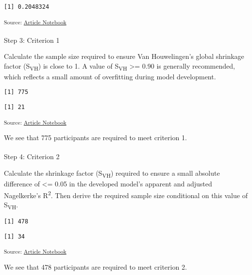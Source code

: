 \documentclass[
  letterpaper,
  DIV=11,
  numbers=noendperiod]{scrartcl}
\makeatletter
\let\oldparagraph\paragraph
\renewcommand{\paragraph}{
    \@ifstar
      \xxxParagraphStar
      \xxxParagraphNoStar
  }
\newcommand{\xxxParagraphStar}[1]{\oldparagraph*{#1}\mbox{}}
\newcommand{\xxxParagraphNoStar}[1]{\oldparagraph{#1}\mbox{}}
\makeatother
\begin{document}
\begin{verbatim}
[1] 0.2048324
\end{verbatim}

\textsubscript{Source:
\href{https://AnTangQuoc.github.io/LZD-TP-pred-model/index.qmd.html}{Article
Notebook}}

\paragraph{Step 3: Criterion 1}\label{step-3-criterion-1}

Calculate the sample size required to ensure Van Houwelingen's global
shrinkage factor (S\textsubscript{VH}) is close to 1. A value of
S\textsubscript{VH} \textgreater= 0.90 is generally recommended, which
reflects a small amount of overfitting during model development.

\begin{verbatim}
[1] 775
\end{verbatim}

\begin{verbatim}
[1] 21
\end{verbatim}

\textsubscript{Source:
\href{https://AnTangQuoc.github.io/LZD-TP-pred-model/index.qmd.html}{Article
Notebook}}

We see that 775 participants are required to meet criterion 1.

\paragraph{Step 4: Criterion 2}\label{step-4-criterion-2}

Calculate the shrinkage factor (S\textsubscript{VH}) required to ensure
a small absolute difference of \textless= 0.05 in the developed model's
apparent and adjusted Nagelkerke's R\textsuperscript{2}. Then derive the
required sample size conditional on this value of S\textsubscript{VH}.

\begin{verbatim}
[1] 478
\end{verbatim}

\begin{verbatim}
[1] 34
\end{verbatim}

\textsubscript{Source:
\href{https://AnTangQuoc.github.io/LZD-TP-pred-model/index.qmd.html}{Article
Notebook}}

We see that 478 participants are required to meet criterion 2.
\end{document}
